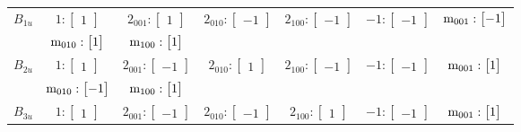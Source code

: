 \documentclass[fleqn,8pt,landscape]{jsarticle}
\begin{document}
\begin{longtable}{ccccccc}
$ B_{1u} $ & $ 1:\begin{bmatrix} 1 \end{bmatrix} $ & $ 2{}_{001}:\begin{bmatrix} 1 \end{bmatrix} $ & $ 2{}_{010}:\begin{bmatrix} -1 \end{bmatrix} $ & $ 2{}_{100}:\begin{bmatrix} -1 \end{bmatrix} $ & $ -1:\begin{bmatrix} -1 \end{bmatrix} $ & $ {\rm m}_{001}:\begin{bmatrix} -1 \end{bmatrix} $ \\
& $ {\rm m}_{010}:\begin{bmatrix} 1 \end{bmatrix} $ & $ {\rm m}_{100}:\begin{bmatrix} 1 \end{bmatrix} $ & $  $ & $  $ & $  $ & $  $ \\ \hline
$ B_{2u} $ & $ 1:\begin{bmatrix} 1 \end{bmatrix} $ & $ 2{}_{001}:\begin{bmatrix} -1 \end{bmatrix} $ & $ 2{}_{010}:\begin{bmatrix} 1 \end{bmatrix} $ & $ 2{}_{100}:\begin{bmatrix} -1 \end{bmatrix} $ & $ -1:\begin{bmatrix} -1 \end{bmatrix} $ & $ {\rm m}_{001}:\begin{bmatrix} 1 \end{bmatrix} $ \\
& $ {\rm m}_{010}:\begin{bmatrix} -1 \end{bmatrix} $ & $ {\rm m}_{100}:\begin{bmatrix} 1 \end{bmatrix} $ & $  $ & $  $ & $  $ & $  $ \\ \hline
$ B_{3u} $ & $ 1:\begin{bmatrix} 1 \end{bmatrix} $ & $ 2{}_{001}:\begin{bmatrix} -1 \end{bmatrix} $ & $ 2{}_{010}:\begin{bmatrix} -1 \end{bmatrix} $ & $ 2{}_{100}:\begin{bmatrix} 1 \end{bmatrix} $ & $ -1:\begin{bmatrix} -1 \end{bmatrix} $ & $ {\rm m}_{001}:\begin{bmatrix} 1 \end{bmatrix} $ \\

\end{longtable}
\end{document}
